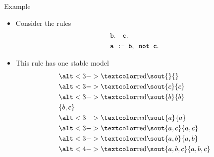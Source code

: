 \begin{frame}[c]{Example}
  \begin{itemize}
  \item Consider the rules
    \begin{align*}
      &{\tt b.\quad   c.}\\
      &{\tt a\texttt{ :- } b,\texttt{ not }c.}
    \end{align*}
  \item <2-> This rule has one stable model
    \begin{align*}
      &\STROUT{3-}{}\\
      &\STROUT{3-}{c}\\
      &\STROUT{3-}{b}\\
      &\{b,c\}\\
      &\STROUT{3-}{a}\\
      &\STROUT{3-}{a,c}\\
      &\STROUT{3-}{a,b}\\
      &\STROUT{4-}{a,b,c}
    \end{align*}
  \end{itemize}
\end{frame}
%
